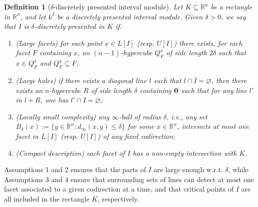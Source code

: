 \documentclass{article}
\newcommand{\field}{k}
\newcommand{\induced}[1]{\field^{#1}}
\newcommand{\R}{\mathbb{R}}
\newcommand{\upperb}[1]{ U[#1] }
\newcommand{\lowerb}[1]{ L[#1] }
\newtheorem{definition}{Definition}%
\newcommand{\rebuttal}[1]{{ #1}}
\begin{document}
\begin{definition}[$\delta$-discretely presented interval module]\label{def:delta_discretely_presented}
	Let $K \subseteq \R^n$ be a rectangle in $ \R^n$,  and let $\rebuttal{\induced{I}}$ be a discretely presented interval module.
	Given $\delta > 0$, we say that $I$ is $\delta$-\emph{discretely presented} in $K$ if: %
	\begin{enumerate}
		\item (Large facets) for each point $x \in \lowerb{I}$ (resp. $\upperb{I}$) there exists, for each facet $F$ containing $x$,
			an $(n-1)$-hypercube $Q^x_F$ of side length $2\delta$ such that $x\in Q^x_F$ and $Q^x_F \subseteq F$; %
		\item (Large holes) if there exists a diagonal line $l$ such that $l\cap I = \varnothing$, then there exists an $n$-hypercube $R$ of side length $\delta$ containing ${\bf 0}$
			such that for any line $l'$ in $l+R$, %
			one has $l' \cap I = \varnothing$;
		\item (Locally small complexity) any $\infty$-ball of radius $\delta$, i.e.,
			any set $B_\delta(x):=\{y\in\R^n : d_\infty(x,y)\le\delta\}$ for some $x\in\R^n$, intersects at most one facet in $\lowerb{I}$ (resp. $\upperb{I}$) of any fixed codirection;
		\item (Compact description) each facet of $I$ has a non-empty intersection with $K$. \\
	\end{enumerate}
\end{definition}

Assumptions 1 and 2 ensures that the parts of $I$ are large enough w.r.t. $\delta$, %
while Assumptions 3 and 4 ensure that surrounding sets of lines can detect at most one facet associated
to a given codirection at a time, and that critical points of $I$ are all included in the rectangle $K$, respectively. \\
\end{document}
